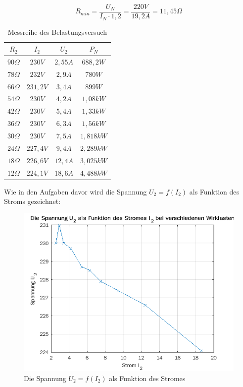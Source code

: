 \documentclass{article}
\begin{document}
\[
  R_{min} = \frac{U_{N}}{I_{N}\cdot 1,2} = \frac{220V}{19,2A} = 11,45\Omega
\]


\begin{table}[h]
  \centering
  \begin{tabular}{|c|c|c|c|}
    \hline
    $R_{2}$ & $I_{2}$ & $U_{2}$ & $P_{N}$ \\
    \hline
    $90\Omega$ & $230V$ & $2,55A$ & $688,2W$\\
    \hline
    $78\Omega$ & $232V$ & $2,9A$ & $780W$\\
    \hline
    $66\Omega$ & $231,2V$ & $3,4A$ & $899W$\\
    \hline
    $54\Omega$ & $230V$ & $4,2A$ & $1,08kW$\\
    \hline
    $42\Omega$ & $230V$ & $5,4A$ & $1,33kW$\\
    \hline
    $36\Omega$ & $230V$ & $6,3A$ & $1,56kW$ \\
    \hline
    $30\Omega$ & $230V$ & $7,5A$ & $1,818kW$ \\
    \hline
    $24\Omega$ & $227,4V$ & $9,4A$ & $2,289kW$ \\
    \hline
    $18\Omega$ & $226,6V$ & $12,4A$ & $3,025kW$ \\
    \hline
    $12\Omega$ & $224,1V$ & $18,6A$ & $4,488kW$\\
    \hline
  \end{tabular}
  \caption{Messreihe des Belastungsversuch}
  \label{tab:messbelast}
\end{table}
\newpage
Wie in den Aufgaben davor wird die Spannung $U_{2} = f(I_{2})$ als Funktion des Stroms gezeichnet:

\begin{figure}[h]
  \centering
  \includegraphics[width=\textwidth]{../assets/images/gep3/i2_u2.png}
  \caption{Die Spannung $U_2 = f(I_2)$ als Funktion des Stromes}
  \label{fig:u2i2}
\end{figure}
\end{document}
